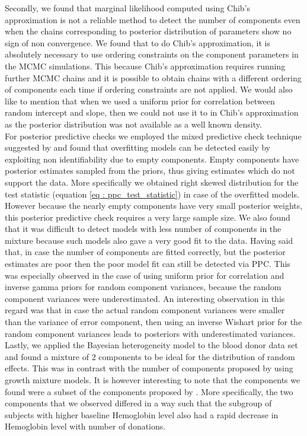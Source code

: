 Secondly, we found that marginal likelihood computed using Chib's approximation is not a reliable method to detect the number of components even when the chains corresponding to posterior distribution of parameters show no sign of non convergence. We found that to do Chib's approximation, it is absolutely necessary to use ordering constraints on the component parameters in the MCMC simulations. This because Chib's approximation requires running further MCMC chains and it is possible to obtain chains with a different ordering of components each time if ordering constraints are not applied. We would also like to mention that when we used a uniform prior for correlation between random intercept and slope, then we could not use it to in Chib's approximation as the posterior distribution was not available as a well known density.\\

For posterior predictive checks we employed the mixed predictive check technique suggested by \citet{marshall_approximate_2003} and found that overfitting models can be detected easily by exploiting non identifiability due to empty components. Empty components have posterior estimates sampled from the priors, thus giving estimates which do not support the data. More specifically we obtained right skewed distribution for the test statistic (equation \ref{eq : ppc_test_statistic}) in case of the overfitted models. However because the nearly empty components have very small posterior weights, this posterior predictive check requires a very large sample size. We also found that it was difficult to detect models with less number of components in the mixture because such models also gave a very good fit to the data. Having said that, in case the number of components are fitted correctly, but the posterior estimates are poor then the poor model fit can still be detected via PPC. This was especially observed in the case of using uniform prior for correlation and inverse gamma priors for random component variances, because the random component variances were underestimated. An interesting observation in this regard was that in case the actual random component variances were smaller than the variance of error component, then using an inverse Wishart prior for the random component variances leads to posteriors with underestimated variances.\\

Lastly, we applied the Bayesian heterogeneity model to the blood donor data set and found a mixture of 2 components to be ideal for the distribution of random effects. This was in contrast with the number of components proposed by \citet{nasserinejad_prevalence_2015} using growth mixture models. It is however interesting to note that the components we found were a subset of the components proposed by \citet{nasserinejad_prevalence_2015}. More specifically, the two components that we observed differed in a way such that the subgroup of subjects with higher baseline Hemoglobin level also had a rapid decrease in Hemoglobin level with number of donations.
